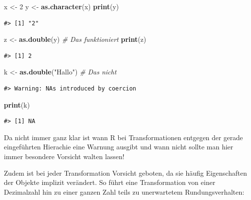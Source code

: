 \documentclass[]{book}
\newenvironment{Shaded}{\begin{snugshade}}{\end{snugshade}}
\newcommand{\KeywordTok}[1]{\textcolor[rgb]{0.13,0.29,0.53}{\textbf{#1}}}
\newcommand{\DecValTok}[1]{\textcolor[rgb]{0.00,0.00,0.81}{#1}}
\newcommand{\StringTok}[1]{\textcolor[rgb]{0.31,0.60,0.02}{#1}}
\newcommand{\CommentTok}[1]{\textcolor[rgb]{0.56,0.35,0.01}{\textit{#1}}}
\newcommand{\NormalTok}[1]{#1}
\begin{document}
\begin{Shaded}
\begin{Highlighting}[]
\NormalTok{x <-}\StringTok{ }\DecValTok{2}
\NormalTok{y <-}\StringTok{ }\KeywordTok{as.character}\NormalTok{(x)}
\KeywordTok{print}\NormalTok{(y)}
\end{Highlighting}
\end{Shaded}

\begin{verbatim}
#> [1] "2"
\end{verbatim}

\begin{Shaded}
\begin{Highlighting}[]
\NormalTok{z <-}\StringTok{ }\KeywordTok{as.double}\NormalTok{(y) }\CommentTok{# Das funktioniert}
\KeywordTok{print}\NormalTok{(z)}
\end{Highlighting}
\end{Shaded}

\begin{verbatim}
#> [1] 2
\end{verbatim}

\begin{Shaded}
\begin{Highlighting}[]
\NormalTok{k <-}\StringTok{ }\KeywordTok{as.double}\NormalTok{(}\StringTok{"Hallo"}\NormalTok{) }\CommentTok{# Das nicht}
\end{Highlighting}
\end{Shaded}

\begin{verbatim}
#> Warning: NAs introduced by coercion
\end{verbatim}

\begin{Shaded}
\begin{Highlighting}[]
\KeywordTok{print}\NormalTok{(k)}
\end{Highlighting}
\end{Shaded}

\begin{verbatim}
#> [1] NA
\end{verbatim}

Da nicht immer ganz klar ist wann R bei Transformationen entgegen der
gerade eingeführten Hierachie eine Warnung ausgibt und wann nicht sollte
man hier immer besondere Vorsicht walten lassen!

Zudem ist bei jeder Transformation Vorsicht geboten, da sie häufig
Eigenschaften der Objekte implizit verändert. So führt eine
Transformation von einer Dezimalzahl hin zu einer ganzen Zahl teils zu
unerwartetem Rundungsverhalten:
\end{document}
